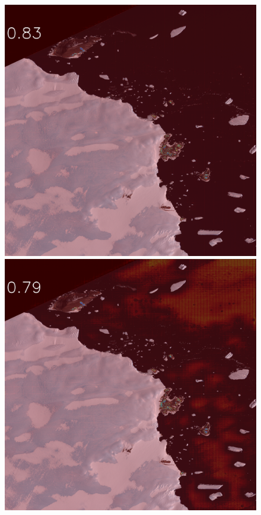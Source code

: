\begin{figure}[h]
\includegraphics[width=\subFigx]{./fig/datagrow/MSE_single_unet_train_1_3.txt_bias-1_bs128_do0.1e25/3.png}
\includegraphics[width=\subFigx]{./fig/datagrow/MSE_single_unet_train_1_4.txt_bias-1_bs128_do0.1e25/3.png}


\end{figure}
